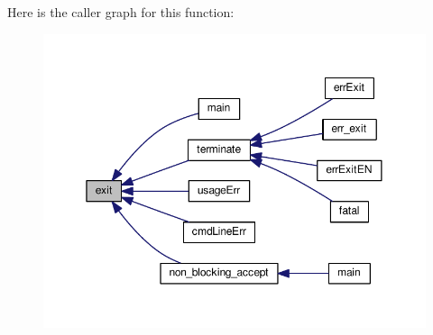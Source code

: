 Here is the caller graph for this function\-:
\nopagebreak
\begin{figure}[H]
\begin{center}
\leavevmode
\includegraphics[width=350pt]{d2/d3d/common_2README_a85c39bfe84eed5e1d7dae87fb0018669_icgraph}
\end{center}
\end{figure}


